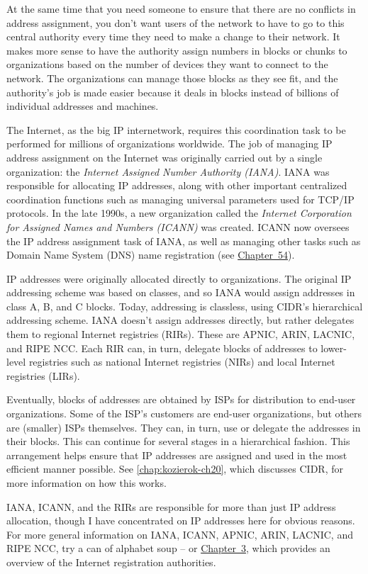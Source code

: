At the same time that you need someone to ensure that there are no
conflicts in address assignment, you don't want users of the network to
have to go to this central authority every time they need to make a
change to their network. It makes more sense to have the authority
assign numbers in blocks or chunks to organizations based on the number
of devices they want to connect to the network. The organizations can
manage those blocks as they see fit, and the authority's job is made
easier because it deals in blocks instead of billions of individual
addresses and machines.

The Internet, as the big IP internetwork, requires this coordination
task to be performed for millions of organizations worldwide. The job of
managing IP address assignment on the Internet was originally carried
out by a single organization: the {\emph{Internet Assigned Number
Authority (IANA)}}. IANA was responsible for allocating IP addresses,
along with other important centralized coordination functions such as
managing universal parameters used for TCP/IP protocols. In the late
1990s, a new organization called the {\emph{Internet Corporation for
Assigned Names and Numbers (ICANN)}} was created. ICANN now oversees the
IP address assignment task of IANA, as well as managing other tasks such
as Domain Name System (DNS) name registration (see
\protect\hyperlink{ch54.html}{Chapter~54}).

IP addresses were originally allocated directly to organizations. The
original IP addressing scheme was based on classes, and so IANA would
assign addresses in class A, B, and C blocks. Today, addressing is
classless, using CIDR's hierarchical addressing scheme. IANA doesn't
assign addresses directly, but rather delegates them to regional
Internet registries (RIRs). These are APNIC, ARIN, LACNIC, and RIPE NCC.
Each RIR can, in turn, delegate blocks of addresses to lower-level
registries such as national Internet registries (NIRs) and local
Internet registries (LIRs).

Eventually, blocks of addresses are obtained by ISPs for distribution to
end-user organizations. Some of the ISP's customers are end-user
organizations, but others are (smaller) ISPs themselves. They can, in
turn, use or delegate the addresses in their blocks. This can continue
for several stages in a hierarchical fashion. This arrangement helps
ensure that IP addresses are assigned and used in the most efficient
manner possible. See \vref{chap:kozierok-ch20}, which
discusses CIDR, for more information on how this works.

IANA, ICANN, and the RIRs are responsible for more than just IP address
allocation, though I have concentrated on IP addresses here for obvious
reasons. For more general information on IANA, ICANN, APNIC, ARIN,
LACNIC, and RIPE NCC, try a can of alphabet soup -- or \protect\hyperlink{ch03.html}{Chapter~3}, which provides an overview of the Internet registration authorities.

